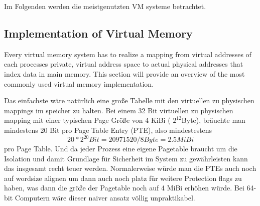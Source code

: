 Im Folgenden werden die meistgenutzten VM systeme betrachtet.


\subsection{Implementation of Virtual Memory}
Every virtual memory system has to realize a mapping from virtual addresses of each processes
private, virtual address space to actual physical addresses that index data in main memory.
This section will provide an overview of the most commonly used virtual memory implementation.

Das einfachste wäre natürlich eine große Tabelle mit den virtuellen zu physischen mappings im
speicher zu halten. Bei einem 32 Bit virtuellen zu physischen mapping mit einer typischen Page Größe
von 4 KiBi ( $ 2^{12}$Byte), bräuchte man mindestens 20 Bit pro Page Table Entry (PTE), also mindestestens
\[ 20 * 2^{20} Bit = 20971520 / 8 Byte = 2.5 MiBi \]
pro Page Table. Und da jeder Prozess eine eigene Pagetable braucht um die Isolation und damit Grundlage
für Sicherheit im System zu gewährleisten kann das insgesamt recht teuer werden.
Normalerweise würde man die PTEs auch noch auf wordsize alignen um dann auch noch platz für weitere
Protection flags zu haben, was dann die größe der Pagetable noch auf 4 MiBi erhöhen würde.
Bei 64-bit Computern wäre dieser naiver ansatz völlig unpraktikabel.
